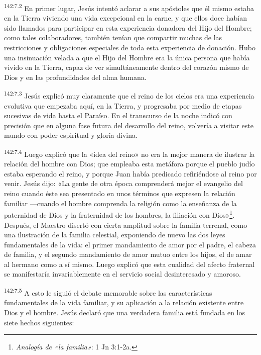 \par 
\textsuperscript{142:7.2} En primer lugar, Jesús intentó aclarar a sus apóstoles que él mismo estaba en la Tierra viviendo una vida excepcional en la carne, y que ellos doce habían sido llamados para participar en esta experiencia donadora del Hijo del Hombre; como tales colaboradores, también tenían que compartir muchas de las restricciones y obligaciones especiales de toda esta experiencia de donación. Hubo una insinuación velada a que el Hijo del Hombre era la única persona que había vivido en la Tierra, capaz de ver simultáneamente dentro del corazón mismo de Dios y en las profundidades del alma humana.

\par 
\textsuperscript{142:7.3} Jesús explicó muy claramente que el reino de los cielos era una experiencia evolutiva que empezaba aquí, en la Tierra, y progresaba por medio de etapas sucesivas de vida hasta el Paraíso. En el transcurso de la noche indicó con precisión que en alguna fase futura del desarrollo del reino, volvería a visitar este mundo con poder espiritual y gloria divina.

\par 
\textsuperscript{142:7.4} Luego explicó que la «idea del reino» no era la mejor manera de ilustrar la relación del hombre con Dios; que empleaba esta metáfora porque el pueblo judío estaba esperando el reino, y porque Juan había predicado refiriéndose al reino por venir. Jesús dijo: «La gente de otra época comprenderá mejor el evangelio del reino cuando éste sea presentado en unos términos que expresen la relación familiar ---cuando el hombre comprenda la religión como la enseñanza de la paternidad de Dios y la fraternidad de los hombres, la filiación con Dios»\footnote{\textit{Analogía de «la familia»}: 1 Jn 3:1-2a.}. Después, el Maestro disertó con cierta amplitud sobre la familia terrenal, como una ilustración de la familia celestial, exponiendo de nuevo las dos leyes fundamentales de la vida: el primer mandamiento de amor por el padre, el cabeza de familia, y el segundo mandamiento de amor mutuo entre los hijos, el de amar al hermano como a sí mismo. Luego explicó que esta cualidad del afecto fraternal se manifestaría invariablemente en el servicio social desinteresado y amoroso.

\par 
\textsuperscript{142:7.5} A esto le siguió el debate memorable sobre las características fundamentales de la vida familiar, y su aplicación a la relación existente entre Dios y el hombre. Jesús declaró que una verdadera familia está fundada en los siete hechos siguientes:

